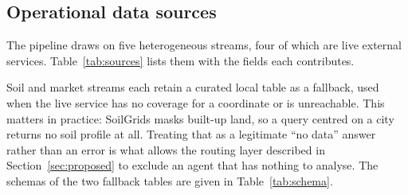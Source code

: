 \documentclass[preprint,12pt]{elsarticle}
\begin{document}
\subsection{Operational data sources}

The pipeline draws on five heterogeneous streams, four of which are live
external services. Table~\ref{tab:sources} lists them with the fields each
contributes.

\begin{table}[H]
\centering
\caption{Operational data sources and the fields each contributes.}
\label{tab:sources}
\footnotesize
{}
\end{table}

Soil and market streams each retain a curated local table as a fallback,
used when the live service has no coverage for a coordinate or is
unreachable. This matters in practice: SoilGrids masks built-up land, so a
query centred on a city returns no soil profile at all. Treating that as a
legitimate ``no data'' answer rather than an error is what allows the
routing layer described in Section~\ref{sec:proposed} to exclude an agent
that has nothing to analyse. The schemas of the two fallback tables are
given in Table~\ref{tab:schema}.
\end{document}
